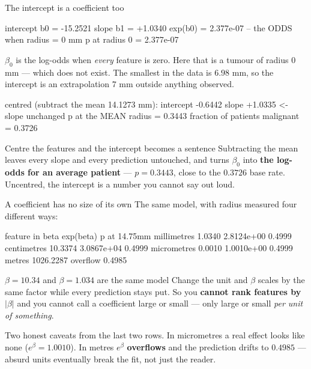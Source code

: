 \documentclass[aspectratio=169]{beamer}
\begin{document}
\begin{frame}[fragile,shrink=8]{The intercept is a coefficient too}
\begin{outblk}
   intercept b0 = -15.2521      slope b1 = +1.0340
   exp(b0) = 2.377e-07  -- the ODDS when radius = 0 mm
   p at radius 0 = 2.377e-07
\end{outblk}
$\beta_0$ is the log-odds when \emph{every} feature is zero. Here that is a
tumour of radius $0$ mm --- which does not exist. The smallest in the data is
$6.98$ mm, so the intercept is an extrapolation $7$ mm outside anything
observed.
\begin{outblk}
   centred (subtract the mean 14.1273 mm):
   intercept -0.6442      slope +1.0335     <- slope unchanged
   p at the MEAN radius            = 0.3443
   fraction of patients malignant  = 0.3726
\end{outblk}
\begin{alertblock}{Centre the features and the intercept becomes a sentence}
  \footnotesize Subtracting the mean leaves every slope and every prediction
  untouched, and turns $\beta_0$ into \textbf{the log-odds for an average
  patient} --- $p = 0.3443$, close to the $0.3726$ base rate. Uncentred, the
  intercept is a number you cannot say out loud.
\end{alertblock}
\end{frame}

\begin{frame}[fragile,shrink=8]{A coefficient has no size of its own}
The same model, with radius measured four different ways:
\begin{outblk}
feature in             beta      exp(beta)  p at 14.75mm
millimetres          1.0340     2.8124e+00        0.4999
centimetres         10.3374     3.0867e+04        0.4999
micrometres          0.0010     1.0010e+00        0.4999
metres            1026.2287       overflow        0.4985
\end{outblk}
\begin{alertblock}{$\beta = 10.34$ and $\beta = 1.034$ are the same model}
  \footnotesize Change the unit and $\beta$ scales by the same factor while
  every prediction stays put. So you \textbf{cannot rank features by
  $|\beta|$} and you cannot call a coefficient large or small --- only large
  or small \emph{per unit of something}.
\end{alertblock}
\begin{center}\footnotesize
  Two honest caveats from the last two rows. In micrometres a real effect
  looks like none ($e^\beta = 1.0010$). In metres $e^\beta$
  \textbf{overflows} and the prediction drifts to $0.4985$ --- absurd units
  eventually break the fit, not just the reader.
\end{center}
\end{frame}
\end{document}
